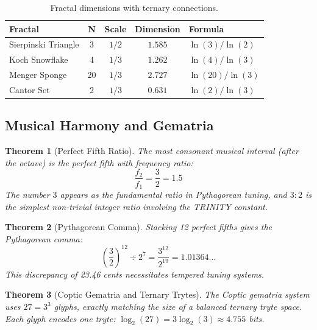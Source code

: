 \documentclass[aps,prd,preprint,superscriptaddress,showpacs,nofootinbib,longbibliography]{revtex4-2}
\newtheorem{theorem}{Theorem}
\begin{document}
\begin{table}[h]
\centering
\small
\begin{tabular}{@{}lcccl@{}}
\toprule
\textbf{Fractal} & \textbf{N} & \textbf{Scale} & \textbf{Dimension} & \textbf{Formula} \\
\midrule
Sierpinski Triangle & 3 & $1/2$ & $1.585$ & $\ln(3)/\ln(2)$ \\
Koch Snowflake & 4 & $1/3$ & $1.262$ & $\ln(4)/\ln(3)$ \\
Menger Sponge & 20 & $1/3$ & $2.727$ & $\ln(20)/\ln(3)$ \\
Cantor Set & 2 & $1/3$ & $0.631$ & $\ln(2)/\ln(3)$ \\
\bottomrule
\end{tabular}
\caption{Fractal dimensions with ternary connections.}
\label{tab:fractals}
\end{table}

\subsection{Musical Harmony and Gematria}
\label{sec:music}

\begin{theorem}[Perfect Fifth Ratio]
\label{thm:perfect_fifth}
The most consonant musical interval (after the octave) is the perfect fifth with frequency ratio:
\begin{equation}
\frac{f_2}{f_1} = \frac{3}{2} = 1.5
\end{equation}
The number $3$ appears as the fundamental ratio in Pythagorean tuning, and $3:2$ is the simplest non-trivial integer ratio involving the TRINITY constant.
\end{theorem}

\begin{theorem}[Pythagorean Comma]
\label{thm:comma}
Stacking 12 perfect fifths gives the Pythagorean comma:
\begin{equation}
\left(\frac{3}{2}\right)^{12} \div 2^7 = \frac{3^{12}}{2^{19}} = 1.01364\ldots
\end{equation}
This discrepancy of 23.46 cents necessitates tempered tuning systems.
\end{theorem}

\begin{theorem}[Coptic Gematria and Ternary Trytes]
\label{thm:gematria}
The Coptic gematria system uses $27 = 3^3$ glyphs, exactly matching the size of a balanced ternary tryte space. Each glyph encodes one tryte: $\log_2(27) = 3\log_2(3) \approx 4.755$ bits.
\end{theorem}
\end{document}
